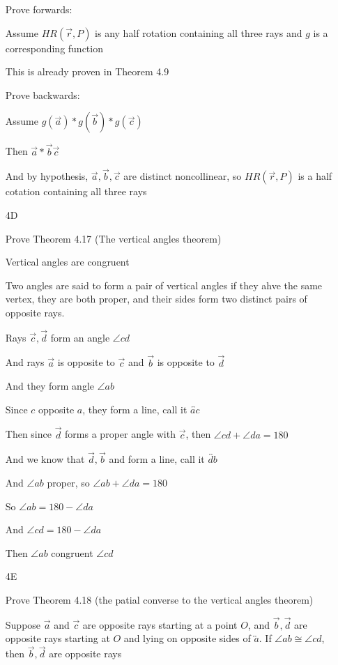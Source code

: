 \documentclass[11pt]{article}
\newcommand{\ray}[1]{\overrightarrow{#1}}
\newcommand{\lines}[1]{\overleftrightarrow{#1}}
\begin{document}
\begin{itemize}
		Prove forwards: 

		Assume $HR(\ray{r}, P)$ is any half rotation containing all three rays and $g$ is a corresponding function

		This is already proven in Theorem 4.9	

		Prove backwards: 

		Assume $g(\ray{a}) * g(\ray{b}) * g(\ray{c})$

		Then $\ray{a} * \ray{b} \ray{c}$

		And by hypothesis, $\ray{a}, \ray{b}, \ray{c}$ are distinct noncollinear, so $HR(\ray{r}, P)$ is a half cotation containing all three rays

	\item[4D]

		Prove Theorem 4.17 (The vertical angles theorem)

		Vertical angles are congruent

		Two angles are said to form a pair of vertical angles if they ahve the same vertex, they are both proper, and their sides form two distinct pairs of opposite rays. 

		Rays $\ray{c}, \ray{d}$ form an angle $\angle cd$ 

		And rays $\ray{a}$ is opposite to $\ray{c}$ and $\ray{b}$ is opposite to $\ray{d}$

		And they form angle $\angle ab$

		Since $c$ opposite $a$, they form a line, call it $\lines{ac}$

		Then since $\ray{d}$ forms a proper angle with $\ray{c}$, then $\angle{cd} + \angle{da} = 180$

		And we know that $\ray{d}, \ray{b}$ and form a line, call it $\lines{db}$

		And $\angle{ab}$ proper, so $\angle{ab} + \angle{da} = 180$

		So $\angle{ab} = 180 - \angle{da}$

		And $\angle{cd} = 180 - \angle{da}$

		Then $\angle{ab}$ congruent $\angle {cd}$

	\item[4E]

		Prove Theorem 4.18 (the patial converse to the vertical angles theorem)

		Suppose $\ray{a}$ and $\ray{c}$ are opposite rays starting at a point $O$, and $\ray{b}, \ray{d}$ are opposite rays starting at $O$ and lying on opposite sides of $\lines{a}$. If $\angle{ab} \cong \angle{cd}$, then $\ray{b},\ray{d}$ are opposite rays


\end{itemize}
\end{document}

